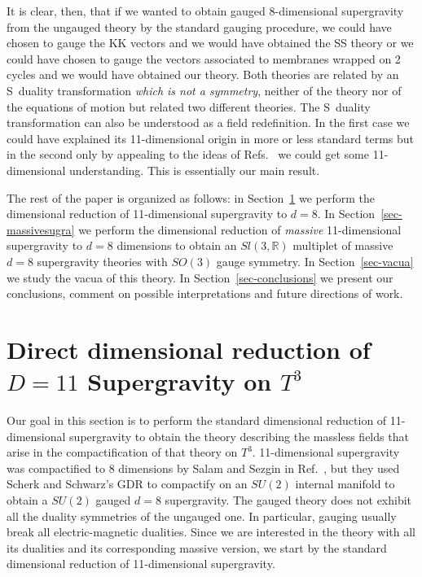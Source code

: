 \documentclass[12pt,a4paper]{article}
\begin{document}
It is clear, then, that if we wanted to obtain gauged 8-dimensional
supergravity from the ungauged theory by the standard gauging
procedure, we could have chosen to gauge the KK vectors and we would
have obtained the SS theory or we could have chosen to gauge the
vectors associated to membranes wrapped on 2 cycles and we would have
obtained our theory. Both theories are related by an S~duality
transformation {\it which is not a symmetry}, neither of the theory
nor of the equations of motion but related two different theories. The
S~duality transformation can also be understood as a field
redefinition.  In the first case we could have explained its
11-dimensional origin in more or less standard terms but in the second
only by appealing to the ideas of Refs.~\cite{kn:BLO,kn:MO} we could
get some 11-dimensional understanding.  This is essentially our main
result.

The rest of the paper is organized as follows: in
Section~\ref{sec-masslesssugra} we perform the dimensional reduction
of 11-dimensional supergravity to $d=8$. In
Section~\ref{sec-massivesugra} we perform the dimensional reduction of
{\it massive} 11-dimensional supergravity to $d=8$ dimensions to
obtain an $Sl(3,\mathbb{R})$ multiplet of massive $d=8$ supergravity
theories with $SO(3)$ gauge symmetry.  In Section~\ref{sec-vacua} we
study the vacua of this theory.  In Section~\ref{sec-conclusions} we
present our conclusions, comment on possible interpretations and
future directions of work.


\section{Direct dimensional reduction of $D=11$ Supergravity on $T^{3}$}
\label{sec-masslesssugra}

Our goal in this section is to perform the standard dimensional
reduction of 11-dimensional supergravity to obtain the theory
describing the massless fields that arise in the compactification of
that theory on $T^{3}$. 11-dimensional supergravity was compactified
to 8 dimensions by Salam and Sezgin in Ref.~\cite{kn:SaSe}, but they
used Scherk and Schwarz's GDR \cite{kn:SS} to compactify on an $SU(2)$
internal manifold to obtain a $SU(2)$ gauged $d=8$ supergravity. The
gauged theory does not exhibit all the duality symmetries of the
ungauged one. In particular, gauging usually break all
electric-magnetic dualities. Since we are interested in the theory
with all its dualities and its corresponding massive version, we start
by the standard dimensional reduction of 11-dimensional supergravity.
\end{document}
